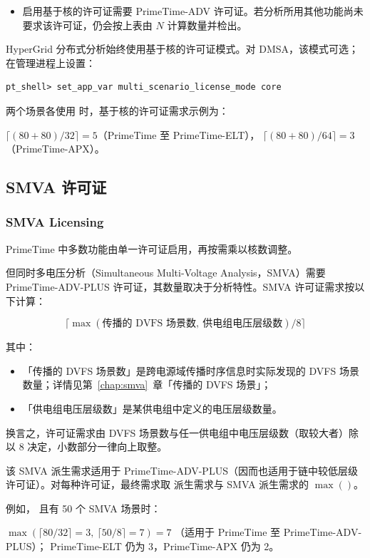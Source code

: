 \begin{itemize}
  \item 启用基于核的许可证需要 PrimeTime-ADV 许可证。若分析所用其他功能尚未要求该许可证，仍会按上表由 $N$ 计算数量并检出。
\end{itemize}

HyperGrid 分布式分析始终使用基于核的许可证模式。对 DMSA，该模式可选；在管理进程上设置：
\begin{lstlisting}
pt_shell> set_app_var multi_scenario_license_mode core
\end{lstlisting}

两个场景各使用  时，基于核的许可证需求示例为：
\begin{center}
$\lceil (80+80)/32 \rceil = 5$（PrimeTime 至 PrimeTime-ELT），
$\lceil (80+80)/64 \rceil = 3$（PrimeTime-APX）。
\end{center}

\subsection{SMVA 许可证}
\subsubsection*{SMVA Licensing}

PrimeTime 中多数功能由单一许可证启用，再按需乘以核数调整。

但同时多电压分析（Simultaneous Multi-Voltage Analysis，SMVA）需要 PrimeTime-ADV-PLUS 许可证，其数量取决于分析特性。SMVA 许可证需求按以下计算：

\[
\lceil \max(\text{传播的 DVFS 场景数},\ \text{供电组电压层级数}) / 8 \rceil
\]

其中：
\begin{itemize}
  \item 「传播的 DVFS 场景数」是跨电源域传播时序信息时实际发现的 DVFS 场景数量；详情见第~\ref{chap:smva}~章「传播的 DVFS 场景」；
  \item 「供电组电压层级数」是某供电组中定义的电压层级数量。
\end{itemize}

换言之，许可证需求由 DVFS 场景数与任一供电组中电压层级数（取较大者）除以 8 决定，小数部分一律向上取整。

该 SMVA 派生需求适用于 PrimeTime-ADV-PLUS（因而也适用于链中较低层级许可证）。对每种许可证，最终需求取  派生需求与 SMVA 派生需求的 $\max()$。

例如， 且有 50 个 SMVA 场景时：
\begin{center}
$\max(\lceil 80/32\rceil=3,\ \lceil 50/8\rceil=7)=7$
（适用于 PrimeTime 至 PrimeTime-ADV-PLUS）；
PrimeTime-ELT 仍为 3，PrimeTime-APX 仍为 2。
\end{center}

